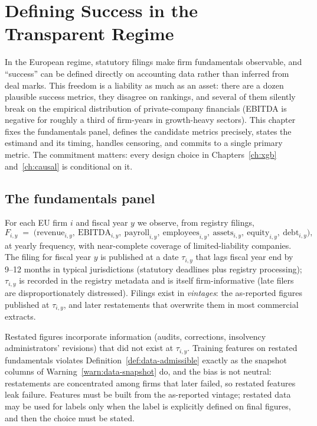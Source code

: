 \chapter{Defining Success in the Transparent Regime}
\label{ch:success}

In the European regime, statutory filings make firm fundamentals observable, and
``success'' can be defined directly on accounting data rather than inferred from deal
marks. This freedom is a liability as much as an asset: there are a dozen plausible
success metrics, they disagree on rankings, and several of them silently break on the
empirical distribution of private-company financials (EBITDA is negative for roughly a
third of firm-years in growth-heavy sectors). This chapter fixes the fundamentals panel,
defines the candidate metrics precisely, states the estimand and its timing, handles
censoring, and commits to a single primary metric. The commitment matters: every design
choice in Chapters~\ref{ch:xgb} and~\ref{ch:causal} is conditional on it.

\section{The fundamentals panel}
\label{sec:success-panel}

For each EU firm $i$ and fiscal year $y$ we observe, from registry filings,
\begin{equation}
\label{eq:success-panel}
F_{i,y} \;=\; \big(\text{revenue}_{i,y},\ \text{EBITDA}_{i,y},\
\text{payroll}_{i,y},\ \text{employees}_{i,y},\ \text{assets}_{i,y},\
\text{equity}_{i,y},\ \text{debt}_{i,y}\big),
\end{equation}
at yearly frequency, with near-complete coverage of limited-liability companies. The
filing for fiscal year $y$ is published at a date $\tau_{i,y}$ that lags fiscal year end
by 9--12 months in typical jurisdictions (statutory deadlines plus registry processing);
$\tau_{i,y}$ is recorded in the registry metadata and is itself firm-informative (late
filers are disproportionately distressed). Filings exist in \emph{vintages}: the
as-reported figures published at $\tau_{i,y}$, and later restatements that overwrite
them in most commercial extracts.

\begin{warning}
\label{warn:success-vintage}
Restated figures incorporate information (audits, corrections, insolvency
administrators' revisions) that did not exist at $\tau_{i,y}$. Training features on
restated fundamentals violates Definition~\ref{def:data-admissible} exactly as the
snapshot columns of Warning~\ref{warn:data-snapshot} do, and the bias is not neutral:
restatements are concentrated among firms that later failed, so restated features leak
failure. Features must be built from the as-reported vintage; restated data may be used
for labels only when the label is explicitly defined on final figures, and then the
choice must be stated.
\end{warning}

